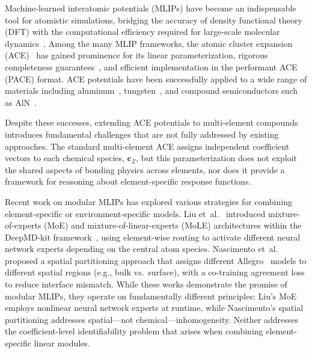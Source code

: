 \documentclass[twoside,prb,aps,floatfix,superscriptaddress,longbibliography]{revtex4-2}
\begin{document}
Machine-learned interatomic potentials (MLIPs) have become an indispensable tool for atomistic simulations, bridging the accuracy of density functional theory (DFT) with the computational efficiency required for large-scale molecular dynamics~\cite{Shapeev2016MTP,Drautz2019ACE,Batatia2022MACE}. Among the many MLIP frameworks, the atomic cluster expansion (ACE)~\cite{Drautz2019ACE,Lysogorskiy2021PACE} has gained prominence for its linear parameterization, rigorous completeness guarantees~\cite{Dusson2022ACE}, and efficient implementation in the performant ACE (PACE) format. ACE potentials have been successfully applied to a wide range of materials including aluminum~\cite{Kovacs2021Al}, tungsten~\cite{Byggmastar2020W}, and compound semiconductors such as AlN~\cite{Yang2024AlNACE}.

Despite these successes, extending ACE potentials to multi-element compounds introduces fundamental challenges that are not fully addressed by existing approaches. The standard multi-element ACE assigns independent coefficient vectors to each chemical species, $\mathbf{c}_Z$, but this parameterization does not exploit the shared aspects of bonding physics across elements, nor does it provide a framework for reasoning about element-specific response functions.

Recent work on modular MLIPs has explored various strategies for combining element-specific or environment-specific models. Liu et~al.~\cite{Liu2026ScalingMoE} introduced mixture-of-experts (MoE) and mixture-of-linear-experts (MoLE) architectures within the DeepMD-kit framework~\cite{Wang2018DeepMD}, using element-wise routing to activate different neural network experts depending on the central atom species. Nascimento et~al.~\cite{Nascimento2026MoEFramework} proposed a spatial partitioning approach that assigns different Allegro~\cite{Musaelian2023Allegro} models to different spatial regions (e.g., bulk vs.\ surface), with a co-training agreement loss to reduce interface mismatch. While these works demonstrate the promise of modular MLIPs, they operate on fundamentally different principles: Liu's MoE employs nonlinear neural network experts at runtime, while Nascimento's spatial partitioning addresses spatial---not chemical---inhomogeneity. Neither addresses the coefficient-level identifiability problem that arises when combining element-specific linear modules.
\end{document}
